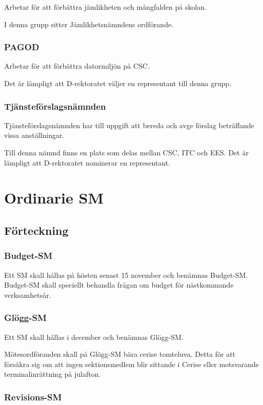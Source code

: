 \documentclass[a4paper,12pt]{article}
\begin{document}
Arbetar för att förbättra jämlikheten och mångfalden på skolan.

I denna grupp sitter Jämlikhetsnämndens ordförande.

\subsubsection{PAGOD}

Arbetar för att förbättra datormiljön på CSC.

Det är lämpligt att D-rektoratet väljer en representant till denna grupp.

\subsubsection{Tjänsteförslagsnämnden}

Tjänsteförslagsnämnden har till uppgift att bereda och avge förslag beträffande vissa anställningar.

Till denna nämnd finns en plats som delas mellan CSC, ITC och EES. Det är lämpligt att D-rektoratet nominerar en representant.

\section{Ordinarie SM}

\subsection{Förteckning}

\subsubsection{Budget-SM}

Ett SM skall hållas på hösten senast 15 november och benämnas Budget-SM. Budget-SM skall speciellt behandla frågan om budget för nästkommande verksamhetsår.

\subsubsection{Glögg-SM}

Ett SM skall hållas i december och benämnas Glögg-SM.

Mötesordföranden skall på Glögg-SM bära cerise tomteluva. Detta för att försäkra sig om att ingen sektionsmedlem blir sittande i Cerise eller motsvarande terminalinrättning på julafton.

\subsubsection{Revisions-SM}
\end{document}
